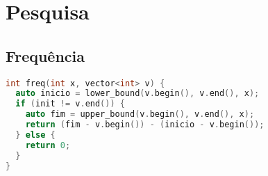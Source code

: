 \chapter{Pesquisa}
\section{Frequência}
\begin{lstlisting}[language=C++]
int freq(int x, vector<int> v) {
  auto inicio = lower_bound(v.begin(), v.end(), x);
  if (init != v.end()) {
    auto fim = upper_bound(v.begin(), v.end(), x);
    return (fim - v.begin()) - (inicio - v.begin());
  } else {
    return 0;
  }
}
\end{lstlisting}